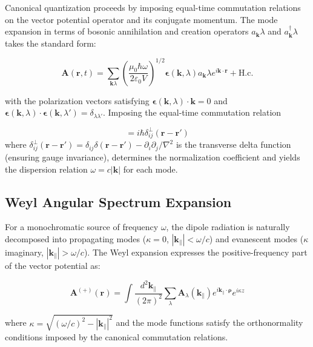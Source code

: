 \documentclass[%
 reprint,
 amsmath,amssymb,
 aps,
 floatfix,
]{revtex4-2}
\begin{document}
Canonical quantization proceeds by imposing equal-time commutation relations on the vector potential operator and its conjugate momentum. The mode expansion in terms of bosonic annihilation and creation operators $a_\mathbf{k}\lambda$ and $a^\dagger_\mathbf{k}\lambda$ takes the standard form:

\begin{equation}
\mathbf{A}(\mathbf{r},t) = \sum_{\mathbf{k}\lambda}\left(\frac{\mu_0\hbar\omega}{2\varepsilon_0 V}\right)^{1/2}\boldsymbol{\epsilon}(\mathbf{k},\lambda) a_\mathbf{k}\lambda e^{i\mathbf{k}\cdot\mathbf{r}} + \text{H.c.}
\end{equation}

with the polarization vectors satisfying $\boldsymbol{\epsilon}(\mathbf{k},\lambda)\cdot\mathbf{k}=0$ and $\boldsymbol{\epsilon}(\mathbf{k},\lambda)\cdot\boldsymbol{\epsilon}(\mathbf{k},\lambda')=\delta_{\lambda\lambda'}$. Imposing the equal-time commutation relation

\begin{equation}
[A_i(\mathbf{r}),\Pi_j(\mathbf{r}')] = i\hbar\delta_{ij}^\perp(\mathbf{r}-\mathbf{r}')
\end{equation}
where $\delta_{ij}^\perp(\mathbf{r}-\mathbf{r}') = \delta_{ij}\delta(\mathbf{r}-\mathbf{r}') - \partial_i\partial_j/\nabla^2$ is the transverse delta function (ensuring gauge invariance), determines the normalization coefficient and yields the dispersion relation $\omega = c|\mathbf{k}|$ for each mode.

\subsection{Weyl Angular Spectrum Expansion}

For a monochromatic source of frequency $\omega$, the dipole radiation is naturally decomposed into propagating modes ($\kappa = 0$, $|\mathbf{k}_\parallel| < \omega/c$) and evanescent modes ($\kappa$ imaginary, $|\mathbf{k}_\parallel| > \omega/c$). The Weyl expansion expresses the positive-frequency part of the vector potential as:

\begin{equation}
\mathbf{A}^{(+)}(\mathbf{r}) = \int\frac{d^2\mathbf{k}_\parallel}{(2\pi)^2}\sum_\lambda\mathbf{A}_\lambda(\mathbf{k}_\parallel)e^{i\mathbf{k}_\parallel\cdot\boldsymbol{\rho}}e^{i\kappa z}
\end{equation}

where $\kappa = \sqrt{(\omega/c)^2 - |\mathbf{k}_\parallel|^2}$ and the mode functions satisfy the orthonormality conditions imposed by the canonical commutation relations.
\end{document}
